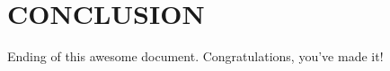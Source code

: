 \chapter{CONCLUSION}\label{chapter conclusion}

Ending of this awesome document. Congratulations, you've made it!\\

\lipsum[5-6]\autocite{knuthwebsite}